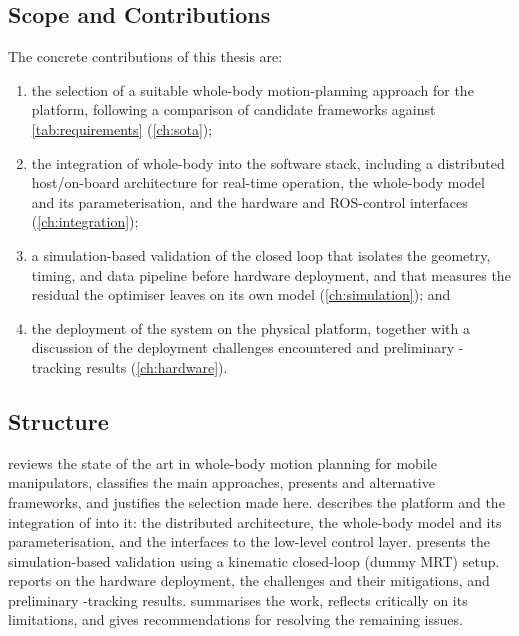 \subsection{Scope and Contributions}
\label{sec:obj-contrib}
The concrete contributions of this thesis are:
\begin{enumerate}
  \item the selection of a suitable whole-body motion-planning approach
        for the \hero{} platform, following a comparison of candidate
        frameworks against \cref{tab:requirements} (\cref{ch:sota});
  \item the integration of \ocs{} whole-body \mpc{} into the \hero{}
        software stack, including a distributed host/on-board
        architecture for real-time operation, the whole-body model and
        its parameterisation, and the hardware and \mbox{ROS-control}
        interfaces (\cref{ch:integration});
  \item a simulation-based validation of the closed loop that isolates
        the geometry, timing, and data pipeline before hardware
        deployment, and that measures the residual the optimiser leaves
        on its own model (\cref{ch:simulation}); and
  \item the deployment of the system on the physical \hero{} platform,
        together with a discussion of the deployment challenges
        encountered and preliminary \ee{}-tracking results
        (\cref{ch:hardware}).
\end{enumerate}

\subsection{Structure}
\label{sec:obj-structure}
 reviews the state of the art in whole-body motion
planning for mobile manipulators, classifies the main approaches,
presents \ocs{} and alternative frameworks, and justifies the selection
made here.  describes the \hero{} platform and the
integration of \ocs{} into it: the distributed architecture, the
whole-body model and its parameterisation, and the interfaces to the
low-level control layer.  presents the
simulation-based validation using a kinematic closed-loop (dummy MRT)
setup.  reports on the hardware deployment, the
challenges and their mitigations, and preliminary \ee{}-tracking
results.  summarises the work, reflects critically
on its limitations, and gives recommendations for resolving the
remaining issues.
